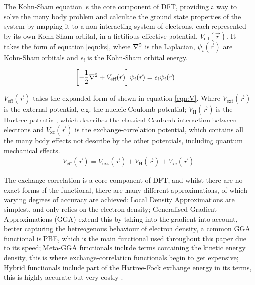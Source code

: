 \documentclass[10pt,a4paper,twocolumn,twoside]{extarticle}
\begin{document}

The Kohn-Sham equation is the core component of DFT, providing a way to solve the many body problem and calculate the ground state properties of the system by mapping it to a non-interacting system of electrons, each represented by its own Kohn-Sham orbital, in a fictitious effective potential, $V_\text{eff}(\vec{r})$. It takes the form of equation \ref{eqn:ks}, where $\laplacian$ is the Laplacian, $\psi_i(\vec{r})$ are Kohn-Sham orbitals and $\epsilon_i$ is the Kohn-Sham orbital energy. 

\begin{align}
	\left[-\frac{1}{2}\laplacian + V_\text{eff}(\vec{r})\right]\psi_i(\vec{r}) &= \epsilon_i \psi_i(\vec{r}) 	
	\label{eqn:ks}
\end{align}

$V_\text{eff}(\vec{r})$ takes the expanded form of shown in equation \ref{eqn:V}. Where $V_\text{ext}(\vec{r})$ is the external potential, e.g. the nucleic Coulomb potential; $V_\text{H}(\vec{r})$ is the Hartree potential, which describes the classical Coulomb interaction between electrons and $V_\text{xc}(\vec{r})$ is the exchange-correlation potential, which contains all the many body effects not describe by the other potentials, including quantum mechanical effects.
\begin{align}
	V_\text{eff}(\vec{r}) = V_\text{ext}(\vec{r}) + V_\text{H}(\vec{r}) + V_\text{xc}(\vec{r})
	\label{eqn:V}
\end{align}



The exchange-correlation is a core component of DFT, and whilst there are no exact forms of the functional, there are many different approximations, of which varying degrees of accuracy are achieved: Local Density Approximations are simplest, and only relies on the electron density; Generalised Gradient Approximations (GGA) extend this by taking into the gradient into account, better capturing the hetreogenous behaviour of electron density, a common GGA functional is PBE\cite{PBE}, which is the main functional used throughout this paper due to its speed; Meta-GGA functionals include terms containing the kinetic energy density, this is where exchange-correlation functionals begin to get expensive; Hybrid functionals include part of the Hartree-Fock exchange energy in its terms, this is highly accurate but very costly \cite{HSE06}.  
\end{document}

